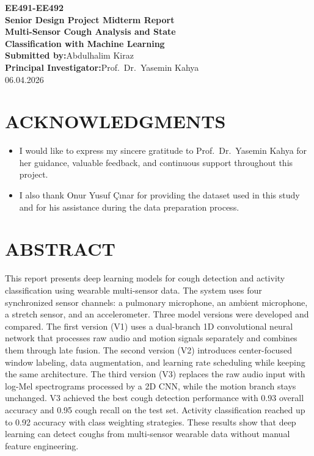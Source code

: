 \documentclass[12pt, a4paper, openany]{report}
\begin{document}

\begin{titlepage}
\centering
\vspace*{1.5cm}
{\Large \textbf{EE491-EE492\\Senior Design Project Midterm Report}}\\[2cm]
{\LARGE \textbf{Multi-Sensor Cough Analysis and State\\[0.3cm]
Classification with Machine Learning}}\\[3cm]
{\large \textbf{Submitted by:}\hspace{0.5em}Abdulhalim Kiraz}\\[1.5cm]
{\large \textbf{Principal Investigator:}\hspace{0.5em}Prof.\ Dr.\ Yasemin Kahya}\\[3cm]
\vfill
{\large 06.04.2026}
\end{titlepage}

\chapter*{ACKNOWLEDGMENTS}
\begin{itemize}
\item I would like to express my sincere gratitude to Prof.\ Dr.\ Yasemin Kahya for her guidance, valuable feedback, and continuous support throughout this project.
\item I also thank Onur Yusuf \c{C}{\i}nar for providing the dataset used in this study and for his assistance during the data preparation process.
\end{itemize}

\chapter*{ABSTRACT}
This report presents deep learning models for cough detection and activity classification using wearable multi-sensor data. The system uses four synchronized sensor channels: a pulmonary microphone, an ambient microphone, a stretch sensor, and an accelerometer. Three model versions were developed and compared. The first version (V1) uses a dual-branch 1D convolutional neural network that processes raw audio and motion signals separately and combines them through late fusion. The second version (V2) introduces center-focused window labeling, data augmentation, and learning rate scheduling while keeping the same architecture. The third version (V3) replaces the raw audio input with log-Mel spectrograms processed by a 2D CNN, while the motion branch stays unchanged. V3 achieved the best cough detection performance with 0.93 overall accuracy and 0.95 cough recall on the test set. Activity classification reached up to 0.92 accuracy with class weighting strategies. These results show that deep learning can detect coughs from multi-sensor wearable data without manual feature engineering.
\end{document}
